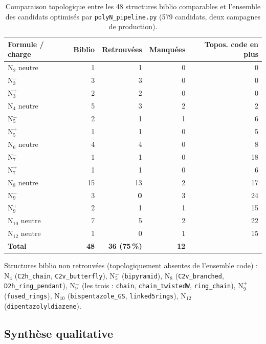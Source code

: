 \documentclass[11pt,a4paper]{article}
\begin{document}
\begin{table}[H]
\centering
\begin{tabular}{lrrrr}
\toprule
Formule / charge & Biblio & Retrouv\'ees & Manqu\'ees & Topos. code en plus \\
\midrule
N$_2$ neutre     & 1  & 1  & 0 & 0  \\
N$_3^{-}$        & 3  & 3  & 0 & 0  \\
N$_3^{+}$        & 2  & 2  & 0 & 0  \\
N$_4$ neutre     & 5  & 3  & 2 & 2  \\
N$_5^{-}$        & 2  & 1  & 1 & 6  \\
N$_5^{+}$        & 1  & 1  & 0 & 5  \\
N$_6$ neutre     & 4  & 4  & 0 & 8  \\
N$_7^{-}$        & 1  & 1  & 0 & 18 \\
N$_7^{+}$        & 1  & 1  & 0 & 6  \\
N$_8$ neutre     & 15 & 13 & 2 & 17 \\
N$_9^{-}$        & 3  & \textbf{0} & 3 & 24 \\
N$_9^{+}$        & 2  & 1  & 1 & 15 \\
N$_{10}$ neutre  & 7  & 5  & 2 & 22 \\
N$_{12}$ neutre  & 1  & 0  & 1 & 15 \\
\midrule
\textbf{Total}   & \textbf{48} & \textbf{36 (75\,\%)} & \textbf{12} & -- \\
\bottomrule
\end{tabular}
\caption{Comparaison topologique entre les 48 structures biblio
comparables et l'ensemble des candidats optimis\'es par
\texttt{polyN\_pipeline.py} (579 candidats, deux campagnes de
production).}
\label{tab:comparaison-48}
\end{table}

Structures biblio non retrouv\'ees (topologiquement absentes de l'ensemble
code) : N$_4$ (\texttt{C2h\_chain}, \texttt{C2v\_butterfly}), N$_5^{-}$
(\texttt{bipyramid}), N$_8$ (\texttt{C2v\_branched},
\texttt{D2h\_ring\_pendant}), N$_9^{-}$ (les trois : \texttt{chain},
\texttt{chain\_twistedW}, \texttt{ring\_chain}), N$_9^{+}$
(\texttt{fused\_rings}), N$_{10}$ (\texttt{bispentazole\_GS},
\texttt{linked5rings}), N$_{12}$ (\texttt{dipentazolyldiazene}).

\subsection{Synth\`ese qualitative}
\end{document}
